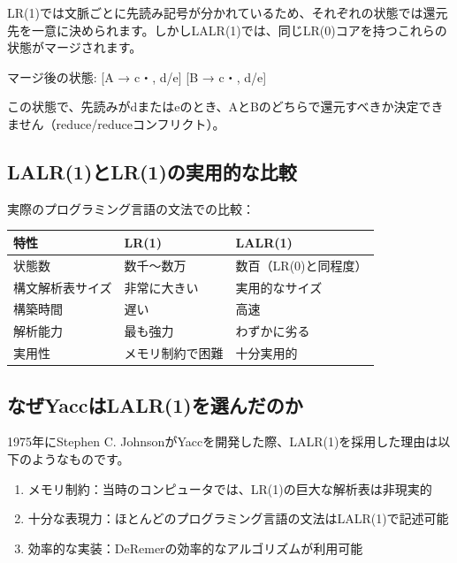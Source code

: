 LR(1)では文脈ごとに先読み記号が分かれているため、それぞれの状態では還元先を一意に決められます。しかしLALR(1)では、同じLR(0)コアを持つこれらの状態がマージされます。

\begin{codescreen}{}
マージ後の状態: {
    [A → c・, d/e]
    [B → c・, d/e]
}
\end{codescreen}

この状態で、先読みがdまたはeのとき、AとBのどちらで還元すべきか決定できません（reduce/reduceコンフリクト）。

\subsection{LALR(1)とLR(1)の実用的な比較}

\noindent 実際のプログラミング言語の文法での比較：

\begin{table}[htb]
  \begin{flushleft}
    \begin{tabular}{lll}\hline
特性 & LR(1) & LALR(1)\\ \hline
状態数 & 数千～数万 & 数百（LR(0)と同程度）\\ \hline
構文解析表サイズ & 非常に大きい & 実用的なサイズ\\ \hline
構築時間 & 遅い & 高速\\ \hline
解析能力 & 最も強力 & わずかに劣る\\ \hline
実用性 & メモリ制約で困難 & 十分実用的\\ \hline
    \end{tabular}
  \end{flushleft}
\end{table}

\subsection{なぜYaccはLALR(1)を選んだのか}

1975年にStephen C.
JohnsonがYaccを開発した際、LALR(1)を採用した理由は以下のようなものです。

\begin{enumerate}
\item
  メモリ制約：当時のコンピュータでは、LR(1)の巨大な解析表は非現実的
\item
  十分な表現力：ほとんどのプログラミング言語の文法はLALR(1)で記述可能
\item
  効率的な実装：DeRemerの効率的なアルゴリズムが利用可能
\end{enumerate}

